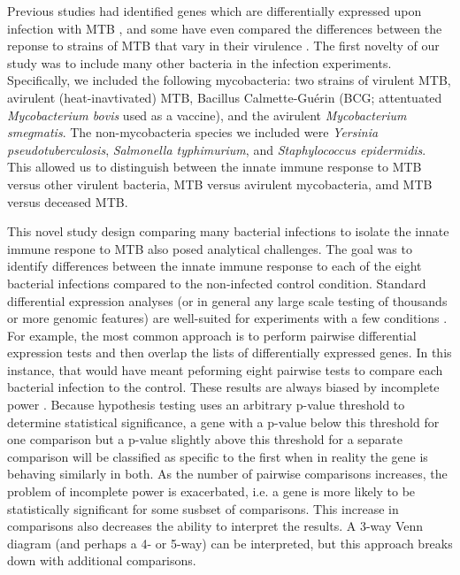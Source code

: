 Previous studies had identified genes which
are differentially expressed upon infection with MTB
\citep{Ehrt2001, Ragno2001, Nau2002, Chaussabel2003, Volpe2006, Tailleux2008}, and some have
even compared the differences between the reponse to strains of MTB
that vary in their virulence \citep{Coscolla2010, Wu2012}. The first novelty of our study was to
include many other bacteria in the infection experiments. Specifically, we
included the following mycobacteria: two strains of virulent MTB,
avirulent (heat-inavtivated) MTB, Bacillus Calmette-Gu\'erin (BCG; attentuated \emph{Mycobacterium
  bovis} used as a vaccine), and the avirulent \emph{Mycobacterium
  smegmatis}. The non-mycobacteria species we included were
\emph{Yersinia pseudotuberculosis}, \emph{Salmonella typhimurium}, and
\emph{Staphylococcus epidermidis}. This allowed us to distinguish
between the innate immune response to MTB versus other virulent
bacteria, MTB versus avirulent mycobacteria, amd MTB versus deceased
MTB.

This novel study design comparing many bacterial infections to isolate
the innate immune respone to MTB also posed analytical
challenges. The goal was to identify differences between the innate immune response
to each of the eight bacterial infections compared to the non-infected control condition.
Standard differential expression analyses (or in general
any large scale testing of thousands or more genomic features) are
well-suited for experiments with a few conditions \citep{Oshlack2010, Anders2013, Ritchie2015}. For example, the
most common approach is to perform pairwise differential expression
tests and then overlap the lists of differentially expressed
genes. In this instance, that would have meant peforming eight
pairwise tests to compare each bacterial infection to the control.
These results are always biased by incomplete power \citep{Ding2010, Flutre2013}. Because
hypothesis testing uses an arbitrary p-value threshold to determine
statistical significance, a gene with a p-value below this threshold
for one comparison but a p-value slightly above this threshold for a
separate comparison will be classified as specific to the first when
in reality the gene is behaving similarly in both. As the number of
pairwise comparisons increases, the problem of incomplete power is
exacerbated, i.e. a gene is more likely to be statistically
significant for some susbset of comparisons. This increase in
comparisons also decreases the ability to interpret the results. A
3-way Venn diagram (and perhaps a 4- or 5-way) can be interpreted, but
this approach breaks down with additional comparisons.

